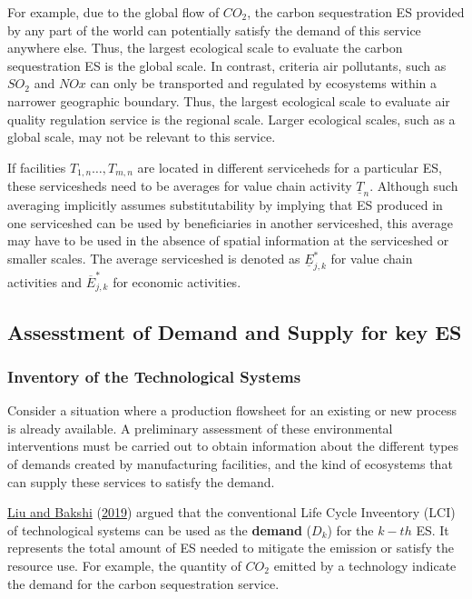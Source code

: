 \documentclass[
  14pt,
]{extarticle}
\begin{document}
For example, due to the global flow of \(CO_{2}\), the carbon sequestration ES provided by any part of the world can potentially satisfy the demand of this service anywhere else.
Thus, the largest ecological scale to evaluate the carbon sequestration ES is the global scale.
In contrast, criteria air pollutants, such as \(SO_{2}\) and \(NO{x}\) can only be transported and regulated by ecosystems within a narrower geographic boundary.
Thus, the largest ecological scale to evaluate air quality regulation service is the regional scale.
Larger ecological scales, such as a global scale, may not be relevant to this service.

If facilities \(T_{1,n}\dots,T_{m,n}\) are located in different serviceheds for a particular ES, these servicesheds need to be averages for value chain activity \(\underline{T}_{n}\).
Although such averaging implicitly assumes substitutability by implying that ES produced in one serviceshed can be used by beneficiaries in another serviceshed, this average may have to be used in the absence of spatial information at the serviceshed or smaller scales.
The average serviceshed is denoted as \(\underline{E}^{*}_{j,k}\) for value chain activities and \(\overline{E}^{*}_{j,k}\) for economic activities.

\hypertarget{assesstment-of-demand-and-supply-for-key-es}{%
\subsection{Assesstment of Demand and Supply for key ES}\label{assesstment-of-demand-and-supply-for-key-es}}

\hypertarget{inventory-of-the-technological-systems}{%
\subsubsection{Inventory of the Technological Systems}\label{inventory-of-the-technological-systems}}

Consider a situation where a production flowsheet for an existing or new process is already available.
A preliminary assessment of these environmental interventions must be carried out to obtain information about the different types of demands created by manufacturing facilities, and the kind of ecosystems that can supply these services to satisfy the demand.

\protect\hyperlink{ref-Liu2019g}{Liu and Bakshi} (\protect\hyperlink{ref-Liu2019g}{2019}) argued that the conventional Life Cycle Inveentory (LCI) of technological systems can be used as the \textbf{demand} (\(D_{k}\)) for the \(k-th\) ES.
It represents the total amount of ES needed to mitigate the emission or satisfy the resource use.
For example, the quantity of \(CO_{2}\) emitted by a technology indicate the demand for the carbon sequestration service.
\end{document}
